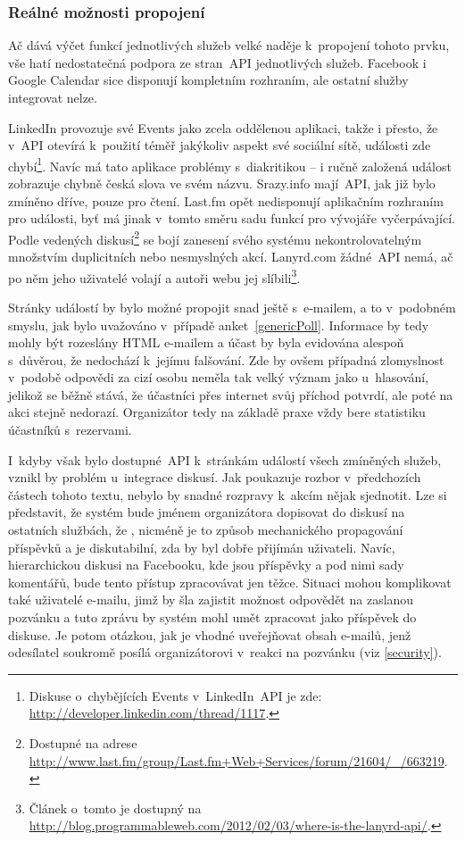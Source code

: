 \documentclass[12pt,oneside,final]{fithesis2}
\begin{document}
\subsubsection*{Reálné možnosti propojení}
Ač dává výčet funkcí jednotlivých služeb velké naděje k~propojení tohoto prvku, vše hatí nedostatečná podpora ze stran~API jednotlivých služeb. Facebook i Google Calendar sice disponují kompletním rozhraním, ale ostatní služby integrovat nelze.

LinkedIn provozuje své Events jako zcela oddělenou aplikaci, takže i přesto, že v~API otevírá k~použití téměř jakýkoliv aspekt své sociální sítě, události zde chybí\footnote{Diskuse o~chybějících Events v~LinkedIn~API je zde: \url{http://developer.linkedin.com/thread/1117}.}. Navíc má tato aplikace problémy s~diakritikou -- i ručně založená událost zobrazuje chybně česká slova ve svém názvu. Srazy.info mají~API, jak již bylo zmíněno dříve, pouze pro čtení. Last.fm opět nedisponují aplikačním rozhraním pro události, byť má jinak v~tomto směru sadu funkcí pro vývojáře vyčerpávající. Podle vedených diskusí\footnote{Dostupné na adrese \url{http://www.last.fm/group/Last.fm+Web+Services/forum/21604/_/663219}.} se bojí zanesení svého systému nekontrolovatelným množstvím duplicitních nebo nesmyslných akcí. Lanyrd.com žádné~API nemá, ač po něm jeho uživatelé volají a autoři webu jej slíbili\footnote{Článek o~tomto je dostupný na \url{http://blog.programmableweb.com/2012/02/03/where-is-the-lanyrd-api/}.}.

Stránky událostí by bylo možné propojit snad ještě s~e-mailem, a to v~podobném smyslu, jak bylo uvažováno v~případě anket~\ref{genericPoll}. Informace by tedy mohly být rozeslány HTML e-mailem a účast by byla evidována alespoň s~důvěrou, že nedochází k~jejímu falšování. Zde by ovšem případná zlomyslnost v~podobě odpovědi za cizí osobu neměla tak velký význam jako u~hlasování, jelikož se běžně stává, že účastníci přes internet svůj příchod potvrdí, ale poté na akci stejně nedorazí. Organizátor tedy na základě praxe vždy bere statistiku účastníků s~rezervami.

I~kdyby však bylo dostupné~API k~stránkám událostí všech zmíněných služeb, vznikl by problém u~integrace diskusí. Jak poukazuje rozbor v~předchozích částech tohoto textu, nebylo by snadné rozpravy k~akcím nějak sjednotit. Lze si představit, že systém bude jménem organizátora dopisovat do diskusí na ostatních službách, že , nicméně je to způsob mechanického propagování příspěvků a je diskutabilní, zda by byl dobře přijímán uživateli. Navíc, hierarchickou diskusi na Facebooku, kde jsou příspěvky a pod nimi sady komentářů, bude tento přístup zpracovávat jen těžce. Situaci mohou komplikovat také uživatelé e-mailu, jimž by šla zajistit možnost odpovědět na zaslanou pozvánku a tuto zprávu by systém mohl umět zpracovat jako příspěvek do diskuse. Je potom otázkou, jak je vhodné uveřejňovat obsah e-mailů, jenž odesílatel soukromě posílá organizátorovi v~reakci na pozvánku (viz \ref{security}).
\end{document}
